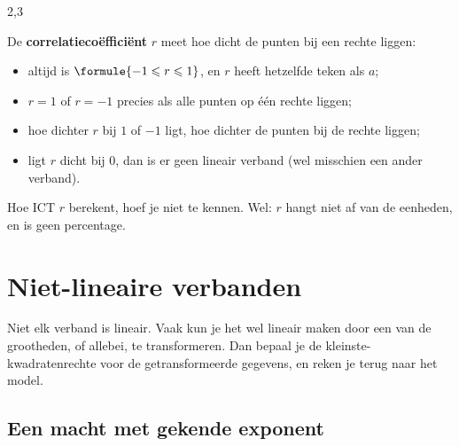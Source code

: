 \begin{alleenvoor}{2,3}
\begin{theorie}
De \textbf{\textcolor{accent}{correlatiecoëfficiënt}} $r$ meet hoe dicht de punten bij een rechte liggen:
\begin{itemize}
\item altijd is $\formule{-1 \leqslant r \leqslant 1}$, en $r$ heeft hetzelfde teken als $a$;
\item $r = 1$ of $r = -1$ precies als alle punten op één rechte liggen;
\item hoe dichter $r$ bij $1$ of $-1$ ligt, hoe dichter de punten bij de rechte liggen;
\item ligt $r$ dicht bij $0$, dan is er geen lineair verband (wel misschien een ander verband).
\end{itemize}
\end{theorie}

Hoe ICT $r$ berekent, hoef je niet te kennen. Wel: $r$ hangt niet af van de eenheden, en is geen percentage.


\begin{oefeningen}
\end{oefeningen}
\end{alleenvoor}

\section{Niet-lineaire verbanden}

Niet elk verband is lineair. Vaak kun je het wel lineair maken door een van de grootheden, of allebei, te transformeren. Dan bepaal je de kleinste-kwadratenrechte voor de getransformeerde gegevens, en reken je terug naar het model.

\subsection{Een macht met gekende exponent}

